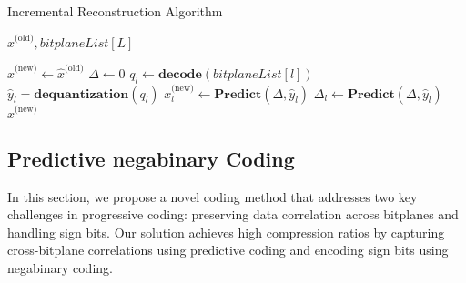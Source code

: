 \begin{algorithm}
\caption{Incremental Reconstruction Algorithm}
\label{alg:incremental}
\begin{algorithmic}[1]  
  \Require $\hat x^{\text{(old)}}, bitplaneList[L]$
  
  \State $\hat x^{\text{(new)}} \gets \hat x^{\text{(old)}}$
  \State $\Delta \gets 0$
    \State $q_l \gets \textbf{decode}(bitplaneList[l])$
    \State $\hat y_l = \textbf{dequantization}(q_l)$
    \State $x_l^{\text{(new)}} \gets \textbf{Predict}(\Delta, \hat y_l)$
    \State $\Delta_l \gets \textbf{Predict}(\Delta, \hat y_l)$
  \EndFor\\
  \Return $\hat x^{\text{(new)}}$
\end{algorithmic}
\end{algorithm}










\subsection{Predictive negabinary Coding}
\label{sec:design coding}

In this section, we propose a novel coding method that addresses two key challenges in progressive coding: preserving data correlation across bitplanes and handling sign bits. Our solution achieves high compression ratios by capturing cross-bitplane correlations using predictive coding and encoding sign bits using negabinary coding.

